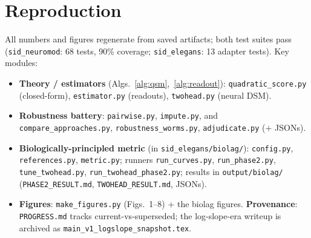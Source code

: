 \documentclass[11pt]{article}
\newcommand{\code}[1]{\texttt{\small #1}}
\begin{document}
\section*{Reproduction}
\small
All numbers and figures regenerate from saved artifacts; both test suites pass (\code{sid\_neuromod}:
68 tests, 90\% coverage; \code{sid\_elegans}: 13 adapter tests). Key modules:
\begin{itemize}[topsep=2pt,itemsep=1pt,leftmargin=1.4em]
  \item \textbf{Theory / estimators} (Algs.~\ref{alg:qsm},~\ref{alg:readout}): \code{quadratic\_score.py}
        (closed-form), \code{estimator.py} (readouts), \code{twohead.py} (neural DSM).
  \item \textbf{Robustness battery}: \code{pairwise.py}, \code{impute.py}, and
        \code{compare\_approaches.py}, \code{robustness\_worms.py}, \code{adjudicate.py} ($+$ JSONs).
  \item \textbf{Biologically-principled metric} (in \code{sid\_elegans/biolag/}): \code{config.py},
        \code{references.py}, \code{metric.py}; runners \code{run\_curves.py}, \code{run\_phase2.py},
        \code{tune\_twohead.py}, \code{run\_twohead\_phase2.py}; results in
        \code{output/biolag/} (\code{PHASE2\_RESULT.md}, \code{TWOHEAD\_RESULT.md}, JSONs).
  \item \textbf{Figures}: \code{make\_figures.py} (Figs.~1--8) $+$ the biolag figures.
        \textbf{Provenance}: \code{PROGRESS.md} tracks current-vs-superseded; the log-slope-era
        writeup is archived as \code{main\_v1\_logslope\_snapshot.tex}.
\end{itemize}
\end{document}
